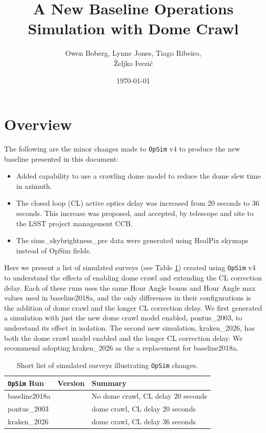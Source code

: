 \documentclass[DM,lsstdraft,authoryear,toc]{lsstdoc}
\title{A New Baseline Operations Simulation with Dome Crawl}
\author{%
Owen Boberg,
Lynne Jones,
Tiago Ribeiro, \\
\v{Z}eljko Ivezi\'{c}}
\date{\today}
\newcommand{\opsim}{\texttt{OpSim}\xspace}
\begin{document}
\maketitle

\section{Overview}

The following are the minor changes made to \opsim v4 to produce the new baseline presented in this document:

\begin{itemize}
\item Added capability to use a crawling dome model to reduce the dome slew time in azimuth.
\item The closed loop (CL) active optics delay was increased from 20 seconds to 36 seconds.
This increase was proposed, and accepted, by telescope and site to the LSST project management CCB.
\item The sims\_skybrightness\_pre data were generated using HealPix skymaps instead of OpSim fields.
\end{itemize}

Here we present a list of simulated surveys (see Table \ref{tab:runlist}) created using \opsim v4 to understand
the effects of enabling dome crawl and extending the CL correction delay. Each of these runs uses the same Hour
Angle bonus and Hour Angle max values used in baseline2018a, and the only differences in their configurations is the
addition of dome crawl and the longer CL correction delay. We first generated a simulation with just the new dome crawl model
enabled, pontus\_2003, to understand its effect in isolation. The second new simulation, kraken\_2026, has both the
dome crawl model enabled and the longer CL correction delay. We recommend adopting kraken\_2026 as the a replacement
for baseline2018a.

\begin{table}[htp]
\caption{Short list of simulated surveys illustrating \opsim changes.}
\begin{center}
\begin{tabular}{ l | l | l }
\toprule
\opsim Run & Version & Summary \\
\midrule
baseline2018a &   &  No dome crawl, CL delay 20 seconds\\
pontus\_2003  &   &  dome crawl, CL delay 20 seconds\\
kraken\_2026  &   &  dome crawl, CL delay 36 seconds\\
\bottomrule
\end{tabular}
\end{center}
\label{tab:runlist}
\end{table}
\end{document}
